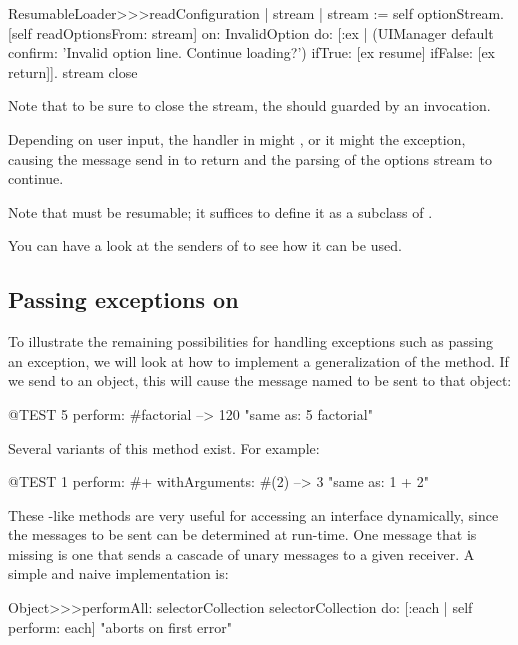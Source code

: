 \begin{code}{}
ResumableLoader>>>readConfiguration
	| stream |
	stream := self optionStream.
	[self readOptionsFrom: stream]
		on: InvalidOption
		do: [:ex | (UIManager default confirm: 'Invalid option line. Continue loading?')
				ifTrue: [ex resume]
				ifFalse: [ex return]].
	stream close
\end{code}

Note that to be sure to close the stream, the  should guarded by an  invocation.

\noindent
Depending on user input, the handler in  might  , or it might  the exception, causing the  message send in  to return and the parsing of the options stream to continue.

Note that  must be resumable; it suffices to define it as a subclass of .

You can have a look at the senders of  to see how it can be used.
\subsection{Passing exceptions on}

To illustrate the remaining possibilities for handling exceptions such as passing an exception, we will look at how to implement a generalization of the  method. If we send  to an object, this will cause the message named  to be sent  to that object:
\begin{code}{@TEST}
5 perform: #factorial --> 120    "same as: 5 factorial"
\end{code}

Several variants of this method exist. For example:
\begin{code}{@TEST}
1 perform: #+ withArguments: #(2) --> 3    "same as: 1 + 2"
\end{code}
These -like methods are very useful for accessing an interface dynamically, since the messages to be sent can be determined at run-time. One message that is missing is one that sends a cascade of unary messages to a given receiver. A simple and naive implementation is:
\begin{code}{}
Object>>>performAll: selectorCollection
	selectorCollection do: [:each | self perform: each]    "aborts on first error"
\end{code}

